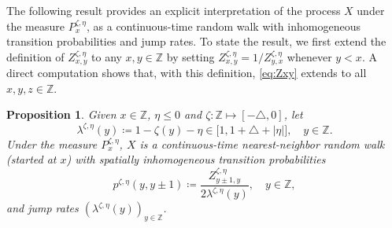 \documentclass[12pt,reqno,oneside]{amsart}
\numberwithin{equation}{section}
\newtheorem{proposition}[theorem]{Proposition}
\theoremstyle{definition}
\theoremstyle{remark}
\newcommand{\Z}{\mathbb{Z}}
\begin{document}
The following result provides an explicit interpretation of the process $X$
under the measure $P_x^{\zeta,\eta}$, as a continuous-time random walk with inhomogeneous
transition probabilities and jump rates. To state the result, we first
extend the definition of $Z_{x,y}^{\zeta,\eta}$ to any $x,y \in \Z$
by setting $Z_{x,y}^{\zeta,\eta} = 1/Z_{y,x}^{\zeta,\eta}$ whenever $y <x$.
A direct computation shows that, with this definition, \eqref{eq:Zxy} extends to all
$x,y,z \in \Z$.

\begin{proposition}
  \label{prop:tilted_RW}
  Given $x \in \Z $, $\eta \leq 0$ and $ \zeta: \Z \mapsto [- \triangle, 0]$,
  let
  \begin{equation}\label{eq:lambda}
    \lambda^{\zeta,\eta}(y)\coloneq1-\zeta(y)-\eta \in \big[1,1 +\triangle+ |\eta|\big],
    \quad y \in \Z.
  \end{equation}
  Under the measure $P_x^{\zeta, \eta}$, $X$ is a continuous-time
  nearest-neighbor random walk (started at $x$)  with spatially inhomogeneous
  transition probabilities
  \begin{equation}\label{eq:p_x_q_x}
    p^{\zeta, \eta}(y,y\pm1) \coloneq
    \frac{Z_{y\pm 1,y}^{\zeta,\eta}}{2\lambda^{\zeta,\eta}(y)},
    \quad y \in \Z,
  \end{equation}
  and jump rates $(\lambda^{\zeta,\eta} (y))_{y \in \Z}$.
\end{proposition}
\end{document}
